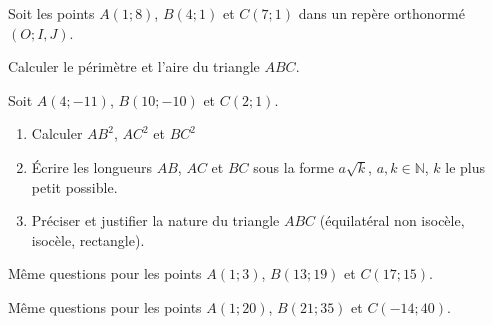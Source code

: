\begin{exercise}  
	Soit les points $A(1;8)$, $B(4;1)$ et $C(7;1)$ dans un repère orthonormé $(O;I,J)$.
	
	Calculer le périmètre  et l'aire du triangle $ABC$. 
\end{exercise}    
\begin{exercise}\label{chapter06:exercice:distances:naturetriangle01}
	Soit $A(4;-11)$, $B(10;-10)$ et $C(2;1)$.
	\begin{enumerate}[label=\alph*),leftmargin=*]
		\item Calculer $AB^2$, $AC^2$ et $BC^2$
		\item Écrire les longueurs  $AB$, $AC$ et $BC$ sous la forme $a\sqrt{k}$, $a,k\in\mathbb{N}$, $k$ le plus petit possible.
		\item Préciser et justifier la nature du triangle $ABC$ (équilatéral non isocèle, isocèle, rectangle).
	\end{enumerate}
\end{exercise}
\begin{exercise}\label{chapter06:exercice:distances:naturetriangle02}
	Même questions pour les points $A(1;3)$, $B(13;19)$ et $C(17;15)$. 
\end{exercise} 
\begin{exercise}\label{chapter06:exercice:distances:naturetriangle03}
	Même questions pour les points $A(1;20)$, $B(21;35)$ et $C(-14;40)$.  
\end{exercise}  

